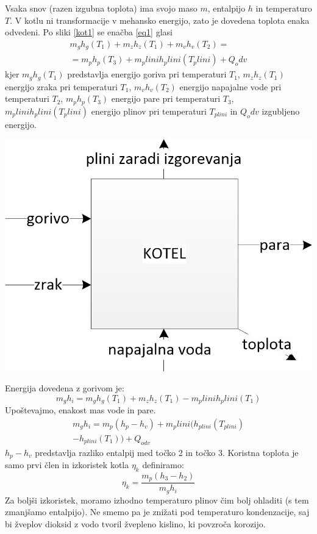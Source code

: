 \documentclass[a4paper,10pt]{article}
\begin{document}
\begin{multicols}{2}
Vsaka snov (razen izgubna toplota) ima svojo maso $m$, entalpijo $h$ in temperaturo $T$. V kotlu ni transformacije v mehansko energijo, zato je dovedena toplota enaka odvedeni. Po sliki \ref{kot1} se enačba \ref{eq1} glasi
\begin{equation}
	\begin{split}
		m_g h_g (T_1 )+ m_z h_z (T_1 )+ m_v h_v (T_2 )= \\
		= m_p h_p (T_3) + m_plini h_plini (T_plini) + Q_odv
	\end{split}
	\label{eq1}
\end{equation}
kjer $m_g h_g (T_1 )$ predstavlja energijo goriva pri temperaturi $T_1$, $m_z h_z (T_1 )$ energijo zraka pri temperaturi $T_1$, $m_v h_v (T_2 )$ energijo napajalne vode pri temperaturi $T_2$, $m_p h_p (T_3)$ energijo pare pri temperaturi $T_3$,$ m_plini h_plini (T_plini )$ energijo plinov pri temperaturi $T_{plini}$ in $Q_odv$ izgubljeno energijo.
\begin{minipage}{\linewidth}
	\includegraphics[width=0.95\columnwidth]{kotel.jpg}
	\label{kot1}
\end{minipage}
Energija dovedena z gorivom je:
\begin{equation}
	m_g h_i  = m_g h_g (T_1) + m_z h_z (T_1) - m_plini h_plini (T_1)
\end{equation}
Upoštevajmo, enakost mas vode in pare.
\begin{equation}
	\begin{split}
		m_g h_i= m_p (h_p-h_v)+m_plini (h_{plini} (T_{plini})\\-h_{plini} (T_1))+Q_{odv}
	\end{split}
\end{equation}
$h_p-h_v$ predstavlja razliko entalpij med točko 2 in točko 3. Koristna toplota je samo prvi člen in izkoristek kotla $\eta_k$ definiramo:
\begin{equation}
	\eta_k=\frac{m_p(h_3-h_2)}{m_gh_i}
\end{equation}
Za boljši izkoristek, moramo izhodno temperaturo plinov čim bolj ohladiti (s tem zmanjšamo entalpijo). Ne smemo pa je znižati pod temperaturo kondenzacije, saj bi žveplov dioksid z vodo tvoril žvepleno kislino, ki povzroča korozijo.


\end{multicols}
\end{document}
